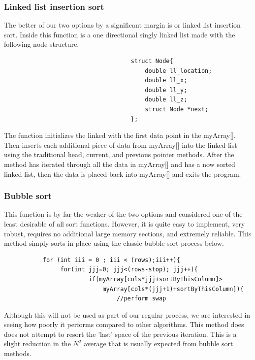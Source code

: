 \documentclass{article}
\begin{document}
\subsubsection{Linked list insertion sort}
The better of our two options by a significant margin is or linked list insertion sort. Inside this function is a one directional singly linked list made with the following node structure.
\begin{lstlisting}
                                    struct Node{
	                                    double ll_location;
	                                    double ll_x;
	                                    double ll_y;
	                                    double ll_z;
	                                    struct Node *next;
                                    };

\end{lstlisting}
The function initializes the linked with the first data point in the myArray[]. Then inserts each additional piece of data from myArray[] into the linked list using the traditional head, current, and previous pointer methods. After the method has iterated through all the data in myArray[] and has a now sorted linked list,  then the data is placed back into myArray[] and exits the program.
\subsubsection{Bubble sort}
This function is by far the weaker of the two options and considered one of the least desirable of all sort functions. However, it is quite easy to implement, very robust, requires no additional large memory sections, and extremely reliable. This method simply sorts in place using the classic bubble sort process below.
\begin{lstlisting}
           for (int iii = 0 ; iii < (rows);iii++){
		        for(int jjj=0; jjj<(rows-stop); jjj++){
			            if(myArray[cols*jjj+sortByThisColumn]>
			                myArray[cols*(jjj+1)+sortByThisColumn]){
				                //perform swap
\end{lstlisting}

Although this will not be used as part of our regular process, we are interested in seeing how poorly it performs compared to other algorithms. This method does does not attempt to resort the 'last' space of the previous iteration. This is a slight reduction in the $N^2$ average that is usually expected from bubble sort methods. 


\end{document}
